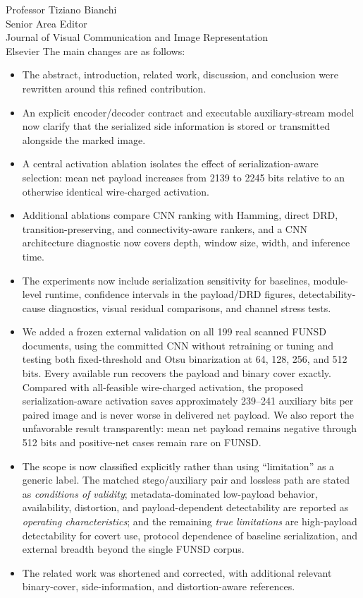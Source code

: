 \documentclass[11pt,a4paper]{letter}
\begin{document}
\begin{letter}{Professor Tiziano Bianchi\\Senior Area Editor\\Journal of Visual Communication and Image Representation\\Elsevier}
The main changes are as follows:
\begin{itemize}
  \item The abstract, introduction, related work, discussion, and conclusion were rewritten around this refined contribution.
  \item An explicit encoder/decoder contract and executable auxiliary-stream model now clarify that the serialized side information is stored or transmitted alongside the marked image.
  \item A central activation ablation isolates the effect of serialization-aware selection: mean net payload increases from 2139 to 2245 bits relative to an otherwise identical wire-charged activation.
  \item Additional ablations compare CNN ranking with Hamming, direct DRD, transition-preserving, and connectivity-aware rankers, and a CNN architecture diagnostic now covers depth, window size, width, and inference time.
  \item The experiments now include serialization sensitivity for baselines, module-level runtime, confidence intervals in the payload/DRD figures, detectability-cause diagnostics, visual residual comparisons, and channel stress tests.
  \item We added a frozen external validation on all 199 real scanned FUNSD documents, using the committed CNN without retraining or tuning and testing both fixed-threshold and Otsu binarization at 64, 128, 256, and 512 bits. Every available run recovers the payload and binary cover exactly. Compared with all-feasible wire-charged activation, the proposed serialization-aware activation saves approximately 239--241 auxiliary bits per paired image and is never worse in delivered net payload. We also report the unfavorable result transparently: mean net payload remains negative through 512 bits and positive-net cases remain rare on FUNSD.
  \item The scope is now classified explicitly rather than using ``limitation'' as a generic label. The matched stego/auxiliary pair and lossless path are stated as \emph{conditions of validity}; metadata-dominated low-payload behavior, availability, distortion, and payload-dependent detectability are reported as \emph{operating characteristics}; and the remaining \emph{true limitations} are high-payload detectability for covert use, protocol dependence of baseline serialization, and external breadth beyond the single FUNSD corpus.
  \item The related work was shortened and corrected, with additional relevant binary-cover, side-information, and distortion-aware references.
\end{itemize}


\end{letter}
\end{document}
